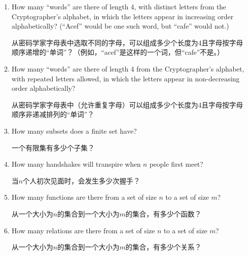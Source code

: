 \begin{enumerate}
  \wbvfill
  
  \item How many ``words'' are there of length 4, with distinct letters from the 
  Cryptographer's alphabet, in which the letters appear in increasing order 
  alphabetically? (``Acef'' would be one such word, but ``cafe'' would not.)
  
  \noindent 从密码学家字母表中选取不同的字母，可以组成多少个长度为4且字母按字母顺序递增的“单词”？（例如，“acef”是这样的一个词，但“cafe”不是。）
  
  \wbvfill
  
  \item How many ``words'' are there of length 4 from the 
  Cryptographer's alphabet, with repeated letters allowed,
   in which the letters appear in non-decreasing order alphabetically?
  
   \noindent 从密码学家字母表中（允许重复字母）可以组成多少个长度为4且字母按字母顺序非递减排列的“单词”？
  \wbvfill
  
  \workbookpagebreak
  
  \item How many subsets does a finite set have?
  
  \noindent 一个有限集有多少个子集？
  
  \wbvfill
  
  \item How many handshakes will transpire when $n$ people first meet?
  
  \noindent 当$n$个人初次见面时，会发生多少次握手？
  \wbvfill
  
  \item How many functions are there from a set of size $n$ to a set of size $m$?
  
  \noindent 从一个大小为$n$的集合到一个大小为$m$的集合，有多少个函数？
  \wbvfill
  
  \item How many relations are there from a set of size $n$ to a set of size $m$?
  
  \noindent 从一个大小为$n$的集合到一个大小为$m$的集合，有多少个关系？
  \wbvfill
  
  \workbookpagebreak
  
  \end{enumerate}
  
